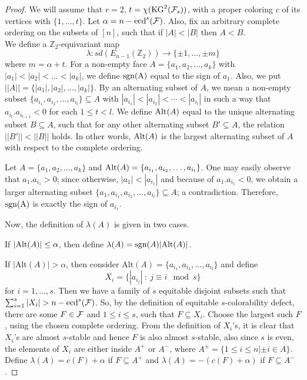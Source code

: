 \documentclass[a4paper,11pt]{article}
\begin{document}
\begin{proof} 
We will assume that $r=2$, $t=\chi(\mbox{KG}^2({\cal F}_s))$, with a proper coloring $c$ of its vertices with $\{1,\dots, t\}$. Let $\alpha=n-\mbox{ecd}^s({\cal F})$. Also, fix an arbitrary complete ordering on the subsets of $[n]$, such that if $|A|<|B|$ then $A<B$.
\\
We define a $\mathbb Z_2$-equivariant map
$$\lambda: sd(E_{n-1}(\mathbb Z_2)) \longrightarrow \{\pm 1,\dots, \pm m\}$$
where $m=\alpha+t$. For a non-empty face $A =\{a_1, a_2, \ldots , a_k\}$ with $|a_1| <|a_2| < \ldots < |a_k| $, we define ${\rm sgn (A)}$ equal to the sign of $a_1$. Also, we put $||A||=\{|a_1| , |a_2| , \ldots , |a_k| \}$. By an alternating subset of $A$, we mean a non-empty subset $\{a_{i_1} , a_{i_2} , \ldots , a_{i_l} \}\subseteq A$ with $|a_{i_1}| <|a_{i_2}| < \cdots < |a_{i_l}|$ in such a way that $a_{i_t}.a_{i_{t+1}} <0$ for each $1\leq t < l$. We define ${\rm Alt}(A)$ equal to the unique alternating subset $B\subseteq A$, such that for any other alternating subset $B' \subseteq A$, the relation $||B'||< ||B||$ holds. In other words, ${\rm Alt}(A)$ is the largest alternating subset of $A$ with respect to the complete ordering. 

Let $A =\{a_1, a_2, \ldots , a_k\}$ and ${\rm Alt}(A)= \{a_{i_1} , a_{i_2} , \ldots , a_{i_l} \}$. One may easily observe that $a_{1}.a_{i_1} >0$; since otherwise, $|a_{1}| < |a_{i_1}| $ and because of $a_{1}.a_{i_1} <0$, we obtain a larger alternating subset  $\{a_{1}, a_{i_1} , a_{i_2} , \ldots , a_{i_l} \}\subseteq A$; a contradiction.
Therefore, ${\rm sgn (A)}$ is exactly the sign of $a_{i_1}$.

\noindent Now, the definition of $\lambda (A)$ is given in two cases.


 If $|{\rm Alt}(A)| \leq \alpha$, then define $\lambda (A) = {\rm sgn}(A)|{\rm Alt}(A)|$.	 

 If $|\mbox{Alt}(A)|>\alpha$, then consider $\mbox{Alt}(A)=\{a_{i_1} , a_{i_2} , \ldots , a_{i_l} \}$ and define $$X_i=\{|a_{i_j}|\: : \: j\equiv i \mod s\}$$ for $i=1,\dots, s$. Then we have a family of $s$ equitable disjoint subsets such that $\sum_{i=1}^s |X_i|>n-\mbox{ecd}^s({\cal F})$. So, by the definition of equitable $s$-colorability defect, there are some $F\in {\cal F}$ and $1\le i\le s$, such that $F\subseteq X_i$. Choose the largest such $F$, using the chosen complete ordering. From the definition of $X_i$'s, it is clear that $X_i$'s are almost $s$-stable and hence $F$ is also almost $s$-stable, also since $s$ is even, the elements of $X_i$ are either inside $A^{+}$ or $A^{-}$, where $A^{\pm}=\{1\le i\le n | \pm i\in A\}$. Define $\lambda(A)=c(F)+\alpha$ if $F\subseteq A^+$ and $\lambda(A)=-(c(F)+\alpha)$ if $F\subseteq A^-$.


\end{proof}
\end{document}
